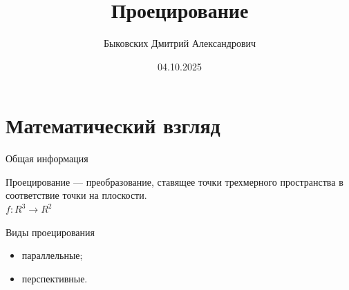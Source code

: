 \documentclass{beamer}
\title[Проецирование]{Проецирование}
\author[Быковских Д.А.]{Быковских Дмитрий Александрович}
\date{04.10.2025}
\begin{document}
	\begin{frame}
		\titlepage
	\end{frame}

	\section{Математический взгляд}

	\begin{frame}{Общая информация}
		
		Проецирование --- преобразование, ставящее точки трехмерного пространства 
		в соответствие точки на плоскости. \\
		$f: R^3 \to R^2$
		
		Виды проецирования
		\begin{itemize}
			\item параллельные;
			\item перспективные.
		\end{itemize}

	\end{frame}
\end{document}
